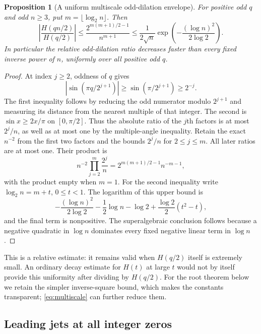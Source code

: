 \documentclass[11pt,a4paper]{article}
\numberwithin{equation}{section}
\newtheorem{proposition}[theorem]{Proposition}
\theoremstyle{definition}
\theoremstyle{remark}
\begin{document}
\begin{proposition}[A uniform multiscale odd-dilation envelope]
\label{prop:multiscale}
For positive odd $q$ and odd $n\ge3$, put $m=\lfloor\log_2 n\rfloor$.
Then
\begin{equation}
 \left|\frac{H(qn/2)}{H(q/2)}\right|
 \le \frac{2^{m(m+1)/2-1}}{n^{m+1}}
 \le \frac1{2\sqrt n}
       \exp\!\left(-\frac{(\log n)^2}{2\log2}\right).
 \label{eq:multiscale}
\end{equation}
In particular the relative odd-dilation ratio decreases faster than every
fixed inverse power of $n$, uniformly over all positive odd $q$.
\end{proposition}
\begin{proof}
At index $j\ge2$, oddness of $q$ gives
\[
 |\sin(\pi q/2^{j+1})|\ge\sin(\pi/2^{j+1})\ge2^{-j}.
\]
The first inequality follows by reducing the odd numerator modulo
$2^{j+1}$ and measuring its distance from the nearest multiple of that
integer. The second is $\sin x\ge2x/\pi$ on $[0,\pi/2]$.
Thus the absolute ratio of the $j$th factors is at most $2^j/n$,
as well as at most one by the multiple-angle inequality. Retain the
exact $n^{-2}$ from the first two factors and the bounds $2^j/n$
for $2\le j\le m$. All later ratios are at most one. Their product is
\[
 n^{-2}\prod_{j=2}^m\frac{2^j}{n}
 =2^{m(m+1)/2-1}n^{-m-1},
\]
with the product empty when $m=1$.
For the second inequality write $\log_2n=m+t$, $0\le t<1$.
The logarithm of this upper bound is
\[
 -\frac{(\log n)^2}{2\log2}-\frac12\log n-\log2
 +\frac{\log2}{2}(t^2-t),
\]
and the final term is nonpositive. The superalgebraic conclusion follows
because a negative quadratic in $\log n$ dominates every fixed negative
linear term in $\log n$.
\end{proof}

This is a relative estimate: it remains valid when $H(q/2)$ itself is
extremely small. An ordinary decay estimate for $H(t)$ at large $t$ would
not by itself provide this uniformity after dividing by $H(q/2)$. For the
root theorem below we retain the simpler inverse-square bound, which makes
the constants transparent; \eqref{eq:multiscale} can further reduce them.

\subsection{Leading jets at all integer zeros}
\end{document}
